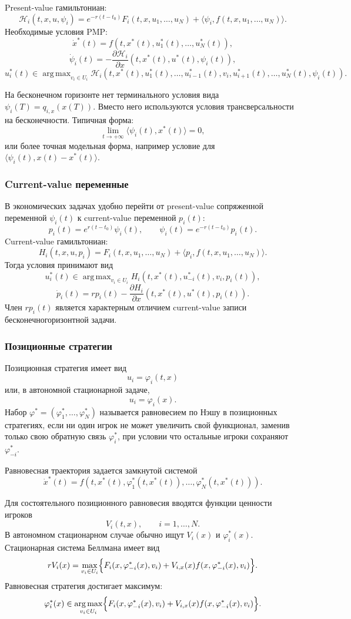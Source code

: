 \documentclass[12pt,a4paper]{article}
\DeclareMathOperator*{\argmax}{arg\,max}
\begin{document}
Present-value гамильтониан:
\[
 \mathcal H_i(t,x,u,\psi_i)=e^{-r(t-t_0)}F_i(t,x,u_1,\ldots,u_N)+\langle\psi_i,f(t,x,u_1,\ldots,u_N)\rangle.
\]
Необходимые условия PMP:
\[
 \dot x^*(t)=f(t,x^*(t),u_1^*(t),\ldots,u_N^*(t)),
\]
\[
 \dot\psi_i(t)=-\frac{\partial\mathcal H_i}{\partial x}(t,x^*(t),u^*(t),\psi_i(t)),
\]
\[
 u_i^*(t)\in\argmax_{v_i\in U_i}\mathcal H_i(t,x^*(t),u_1^*(t),\ldots,u_{i-1}^*(t),v_i,u_{i+1}^*(t),\ldots,u_N^*(t),\psi_i(t)).
\]

На бесконечном горизонте нет терминального условия вида $\psi_i(T)=q_{i,x}(x(T))$. Вместо него используются условия трансверсальности на бесконечности. Типичная форма:
\[
 \lim_{t\to+\infty}\langle\psi_i(t),x^*(t)\rangle=0,
\]
или более точная модельная форма, например условие для $\langle \psi_i(t),x(t)-x^*(t)\rangle$.

\subsubsection{Current-value переменные}

В экономических задачах удобно перейти от present-value сопряженной переменной $\psi_i(t)$ к current-value переменной $p_i(t)$:
\[
 p_i(t)=e^{r(t-t_0)}\psi_i(t),\qquad \psi_i(t)=e^{-r(t-t_0)}p_i(t).
\]
Current-value гамильтониан:
\[
 H_i(t,x,u,p_i)=F_i(t,x,u_1,\ldots,u_N)+\langle p_i,f(t,x,u_1,\ldots,u_N)\rangle.
\]
Тогда условия принимают вид
\[
 u_i^*(t)\in\argmax_{v_i\in U_i}H_i(t,x^*(t),u_{-i}^*(t),v_i,p_i(t)),
\]
\[
 \dot p_i(t)=r p_i(t)-\frac{\partial H_i}{\partial x}(t,x^*(t),u^*(t),p_i(t)).
\]
Член $r p_i(t)$ является характерным отличием current-value записи бесконечногоризонтной задачи.

\subsubsection{Позиционные стратегии}

Позиционная стратегия имеет вид
\[
 u_i=\varphi_i(t,x)
\]
или, в автономной стационарной задаче,
\[
 u_i=\varphi_i(x).
\]
Набор $\varphi^*=(\varphi_1^*,\ldots,\varphi_N^*)$ называется равновесием по Нэшу в позиционных стратегиях, если ни один игрок не может увеличить свой функционал, заменив только свою обратную связь $\varphi_i^*$, при условии что остальные игроки сохраняют $\varphi_{-i}^*$.

Равновесная траектория задается замкнутой системой
\[
 \dot x^*(t)=f(t,x^*(t),\varphi_1^*(t,x^*(t)),\ldots,\varphi_N^*(t,x^*(t))).
\]

Для состоятельного позиционного равновесия вводятся функции ценности игроков
\[
 V_i(t,x),\qquad i=1,\ldots,N.
\]
В автономном стационарном случае обычно ищут $V_i(x)$ и $\varphi_i^*(x)$. Стационарная система Беллмана имеет вид
\[
 rV_i(x)=\max_{v_i\in U_i}\Bigl\{F_i(x,\varphi_{-i}^*(x),v_i)+V_{i,x}(x)f(x,\varphi_{-i}^*(x),v_i)\Bigr\}.
\]
Равновесная стратегия достигает максимум:
\[
 \varphi_i^*(x)\in\argmax_{v_i\in U_i}\Bigl\{F_i(x,\varphi_{-i}^*(x),v_i)+V_{i,x}(x)f(x,\varphi_{-i}^*(x),v_i)\Bigr\}.
\]
\end{document}
